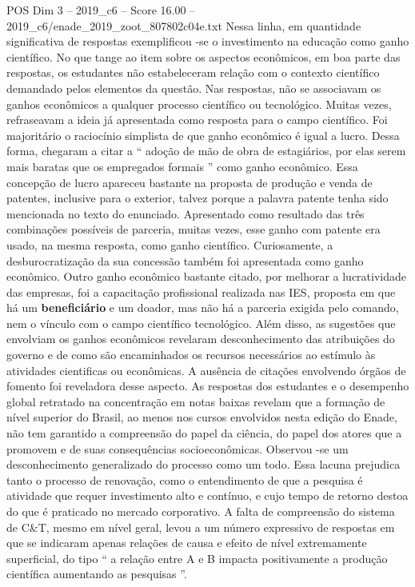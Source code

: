 \begin{textsample}{POS Dim 3 – 2019\_c6 – Score 16.00 – 2019\_c6/enade\_2019\_zoot\_807802c04e.txt}
Nessa linha, em quantidade significativa de respostas exemplificou -se o investimento na educação como ganho científico.
No que tange ao item sobre os aspectos econômicos, em boa parte das respostas, os estudantes não estabeleceram relação com o contexto científico demandado pelos elementos da questão.
Nas respostas, não se associavam os ganhos econômicos a qualquer processo científico ou tecnológico.
Muitas vezes, refraseavam a ideia já apresentada como resposta para o campo científico.
Foi majoritário o raciocínio simplista de que ganho econômico é igual a lucro.
Dessa forma, chegaram a citar a “ adoção de mão de obra de estagiários, por elas serem mais baratas que os empregados formais ” como ganho econômico.
Essa concepção de lucro apareceu bastante na proposta de produção e venda de patentes, inclusive para o exterior, talvez porque a palavra patente tenha sido mencionada no texto do enunciado.
Apresentado como resultado das três combinações possíveis de parceria, muitas vezes, esse ganho com patente era usado, na mesma resposta, como ganho científico.
Curiosamente, a desburocratização da sua concessão também foi apresentada como ganho econômico.
Outro ganho econômico bastante citado, por melhorar a lucratividade das empresas, foi a capacitação profissional realizada nas IES, proposta em que há um \textbf{beneficiário} e um doador, mas não há a parceria exigida pelo comando, nem o vínculo com o campo científico tecnológico.
Além disso, as sugestões que envolviam os ganhos econômicos revelaram desconhecimento das atribuições do governo e de como são encaminhados os recursos necessários ao estímulo às atividades cientificas ou econômicas.
A ausência de citações envolvendo órgãos de fomento foi reveladora desse aspecto.
As respostas dos estudantes e o desempenho global retratado na concentração em notas baixas revelam que a formação de nível superior do Brasil, ao menos nos cursos envolvidos nesta edição do Enade, não tem garantido a compreensão do papel da ciência, do papel dos atores que a promovem e de suas consequências socioeconômicas.
Observou -se um desconhecimento generalizado do processo como um todo.
Essa lacuna prejudica tanto o processo de renovação, como o entendimento de que a pesquisa é atividade que requer investimento alto e contínuo, e cujo tempo de retorno destoa do que é praticado no mercado corporativo.
A falta de compreensão do sistema de C\&T, mesmo em nível geral, levou a um número expressivo de respostas em que se indicaram apenas relações de causa e efeito de nível extremamente superficial, do tipo “ a relação entre A e B impacta positivamente a produção científica aumentando as pesquisas ”.

\end{textsample}
